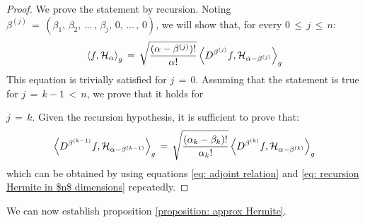 \iflong \begin{proof}
    We prove the statement by recursion. Noting
    $\beta^{(j)}\,=\,(\beta_1,\,\beta_2,\,\dots\,,\,\beta_j,\, 0, \, \dots\,, \, 0) $, we will
    show that, for every $0\, \leq \,j\, \leq \,n$:
    $$
        \left \langle f, \mathcal H_\alpha \right \rangle_g \,=\,\sqrt{\frac
                {(\alpha-\beta^{(j)})!}{\alpha!}} \left \langle D^{\beta^{(j)}} f, \mathcal H_{\alpha-\beta^{(j)}} \right \rangle_g 
    $$ 
    This equation is trivially satisfied for $j\,=\,0$. Assuming that the
    statement is true for $j\,=\,k-1\,<\,n$, we prove that it holds for

    $j\,=\,k$. Given the recursion hypothesis, it is sufficient to prove that:
    $$
        \left \langle
            D^{\beta^{(k-1)}} f, \mathcal H_{\alpha-\beta^{(k-1)}} \right
        \rangle_g \,=\,\sqrt{\frac {(\alpha_k-\beta_k)!}{\alpha_k!}} \left \langle
            D^{\beta^{(k)}} f, \mathcal H_{\alpha-\beta^{(k)}} \right \rangle_g 
    $$
    which can be obtained by using equations \eqref{eq: adjoint relation} and \eqref{eq: recursion Hermite in
    $n$ dimensions} repeatedly.
\end{proof} \fi
We can now establish proposition \ref{proposition: approx Hermite}.
